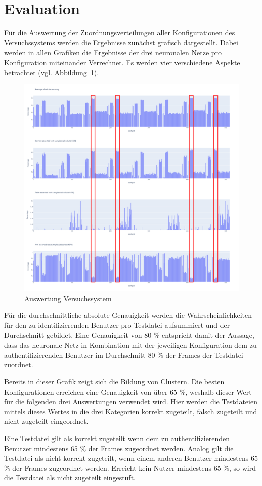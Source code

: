 \section{Evaluation} \label{sec:Evaluation}
Für die Auswertung der Zuordnungsverteilungen aller Konfigurationen des Versuchssystems werden die Ergebnisse zunächst grafisch dargestellt.
Dabei werden in allen Grafiken die Ergebnisse der drei neuronalen Netze pro Konfiguration miteinander Verrechnet.
Es werden vier verschiedene Aspekte betrachtet (vgl. Abbildung~\ref{fig:AuswertungVersuchssystem}).
\begin{figure}[H]
    \centering
    \includegraphics[width=1\textwidth, keepaspectratio]{images/Auswertung.png}
    \caption{Auswertung Versuchssystem}
    \label{fig:AuswertungVersuchssystem}
\end{figure}

Für die durchschnittliche absolute Genauigkeit werden die Wahrscheinlichkeiten für den zu identifizierenden Benutzer pro Testdatei aufsummiert und der Durchschnitt gebildet.
Eine Genauigkeit von 80 \% entspricht damit der Aussage, dass das neuronale Netz in Kombination mit der jeweiligen Konfiguration dem zu authentifizierenden Benutzer im Durchschnitt 80 \% der Frames der Testdatei zuordnet.

Bereits in dieser Grafik zeigt sich die Bildung von Clustern.
Die besten Konfigurationen erreichen eine Genauigkeit von über 65 \%, weshalb dieser Wert für die folgenden drei Auswertungen verwendet wird.
Hier werden die Testdateien mittels dieses Wertes in die drei Kategorien korrekt zugeteilt, falsch zugeteilt und nicht zugeteilt eingeordnet.

Eine Testdatei gilt als korrekt zugeteilt wenn dem zu authentifizierenden Benutzer mindestens 65 \% der Frames zugeordnet werden.
Analog gilt die Testdatei als nicht korrekt zugeteilt, wenn einem anderen Benutzer mindestens 65 \% der Frames zugeordnet werden.
Erreicht kein Nutzer mindestens 65 \%, so wird die Testdatei als nicht zugeteilt eingestuft.

